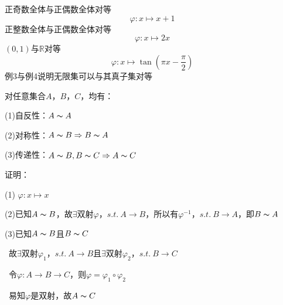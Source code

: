 \\ \hspace*{\fill}\\
正奇数全体与正偶数全体对等
\[\varphi :x\mapsto x+1\]
正整数全体与正偶数全体对等
\[\varphi :x\mapsto 2x\]
$\left(0,1\right) $与$\mathbb{R}$对等
\[\varphi :x\mapsto \tan \left(\pi x - \dfrac{\pi}{2}\right)\]
例3与例4说明无限集可以与其真子集对等

\begin{td}
对任意集合$A$，$B$，$C$，均有：
\par (1)自反性：$A\thicksim A$
\par (2)对称性：$A\thicksim B \Rightarrow B\thicksim A$
\par (3)传递性：$A\thicksim B,B\thicksim C\Rightarrow A\thicksim C$    
\end{td}
\noindent 证明：
\par (1) $\varphi :x\mapsto x$
\par (2)已知$A\thicksim B$，故$\exists$双射$\varphi$，$s.t. \ A \to B$，所以有$\varphi ^{-1}$，$s.t. \ B \to A$，即$B\thicksim A$
\par (3)已知$A\thicksim B$且$B\thicksim C$
\par \quad \ 故$\exists$双射$\varphi_{1}$，$s.t. \ A \to B$且$\exists$双射$\varphi_{2}$，$s.t. \ B \to C$
\par \quad \ 令$\varphi :A \to B \to C$，则$\varphi = \varphi _{1}\circ \varphi _{2}$
\par \quad \ 易知$\varphi $是双射，故$A\thicksim C$

